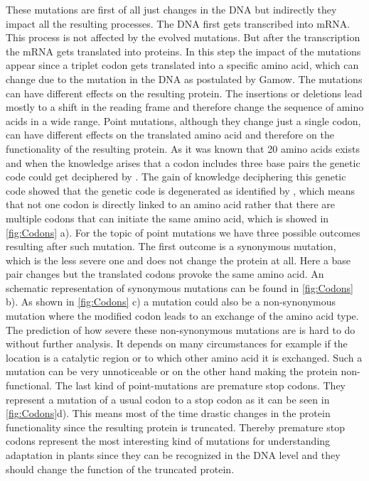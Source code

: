 These mutations are first of all just changes in the DNA but indirectly they impact all the resulting processes. The DNA first gets transcribed into mRNA. This process is not affected by the evolved mutations. But after the transcription the mRNA gets translated into proteins. In this step the impact of the mutations appear since a triplet codon gets translated into a specific amino acid, which can change due to the mutation in the DNA as postulated by Gamow\cite{crick1988}. The mutations can have different effects on the resulting protein. The insertions or deletions lead mostly to a shift in the reading frame and therefore change the sequence of amino acids in a wide range. Point mutations, although they change just a single codon, can have different effects on the translated amino acid and therefore on the functionality of the resulting protein. As it was known that 20 amino acids exists and when the knowledge arises that a codon includes three base pairs the genetic code could get deciphered by \textcite{Nirenberg1965}. The gain of knowledge deciphering this genetic code showed that the genetic code is degenerated as identified by \textcite{Lagerkvist1978}, which means that not one codon is directly linked to an amino acid rather that there are multiple codons that can initiate the same amino acid, which is showed in \autoref{fig:Codons} a). For the topic of point mutations we have three possible outcomes resulting after such mutation. The first outcome is a synonymous mutation, which is the less severe one and does not change the protein at all. Here a base pair changes but the translated codons provoke the same amino acid. An schematic representation of synonymous mutations can be found in \autoref{fig:Codons} b). As shown in \autoref{fig:Codons} c) a mutation could also be a non-synonymous mutation where the modified codon leads to an exchange of the amino acid type. The prediction of how severe these non-synonymous mutations are is hard to do without further analysis. It depends on many circumstances for example if the location is a catalytic region or to which other amino acid it is exchanged. Such a mutation can be very unnoticeable or on the other hand making the protein non-functional. The last kind of point-mutations are premature stop codons. They represent a mutation of a usual codon to a stop codon as it can be seen in \autoref{fig:Codons}d). This means most of the time drastic changes in the protein functionality since the resulting protein is truncated. Thereby premature stop codons represent the most interesting kind of mutations for understanding adaptation in plants since they can be recognized in the DNA level and they should change the function of the truncated protein.\\
